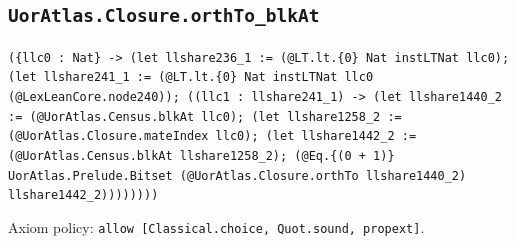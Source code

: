 \documentclass[11pt]{article}
\begin{document}
\subsection*{\texttt{UorAtlas.Closure.orthTo\_blkAt}}
\noindent\texttt{(\{llc0 : Nat\} -> (let llshare236\_1 := (@LT.lt.\{0\} Nat instLTNat llc0); (let llshare241\_1 := (@LT.lt.\{0\} Nat instLTNat llc0 (@LexLeanCore.node240)); ((llc1 : llshare241\_1) -> (let llshare1440\_2 := (@UorAtlas.Census.blkAt llc0); (let llshare1258\_2 := (@UorAtlas.Closure.mateIndex llc0); (let llshare1442\_2 := (@UorAtlas.Census.blkAt llshare1258\_2); (@Eq.\{(0 + 1)\} UorAtlas.Prelude.Bitset (@UorAtlas.Closure.orthTo llshare1440\_2) llshare1442\_2))))))))}\par
\noindent Axiom policy: \texttt{allow [Classical.choice, Quot.sound, propext]}.\par
\end{document}
